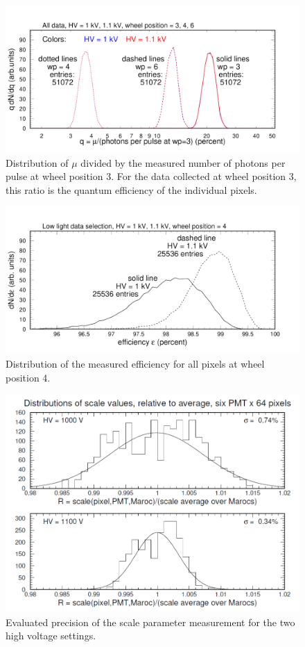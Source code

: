 \begin{figure}[h!bt]
	\centering
	\includegraphics[width=0.95\linewidth]{figures/pglobal_qe_all.pdf}
	\caption{Distribution of $\mu$ divided by the measured number of photons per pulse at wheel position 3. For the data collected at wheel position 3, this ratio is the quantum efficiency of the individual pixels.}
	\label{fig:pglobal_qe_all}
\end{figure}

\begin{figure}[h!bt]
	\centering
	\includegraphics[width=0.95\linewidth]{figures/pglobal_eff.pdf}
	\caption{Distribution of the measured efficiency for all pixels at wheel position 4.}
	\label{fig:pglobal_eff}
\end{figure}

\begin{figure}[h!bt]
	\centering
	\includegraphics[width=0.95\linewidth]{figures/R_scale_maroc_avg.png}
	\caption{Evaluated precision of the scale parameter measurement for the two high voltage settings.}
	\label{fig:R_scale_maroc_avg}
\end{figure}


